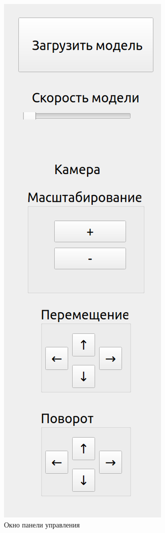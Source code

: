\begin{figure}[H]
	\begin{center}
		\includegraphics[scale=0.3]{img/control-panel.png}
	\end{center}
	\captionsetup{justification=centering}
	\caption{Окно панели управления}
	\label{img:control-panel}
\end{figure}


